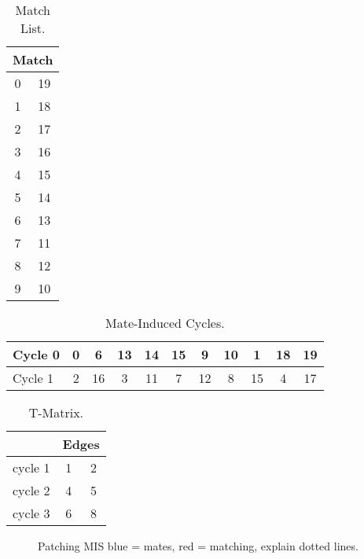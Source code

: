 \documentclass[a4paper, 11pt, twoside, onecolumn, openany]{article}
\begin{document}
\begin{table}[htb]
	\centering
	\begin{tabular}{|c|c|}
		\hline
		\multicolumn{2}{|c|}{Match}\\ \hline
		0 & 19 \\ \hline
		1 & 18 \\ \hline
		2 & 17 \\ \hline
		3 & 16 \\ \hline
		4 & 15 \\ \hline
		5 & 14 \\ \hline
		6 & 13 \\ \hline
		7 & 11 \\ \hline
		8 & 12 \\ \hline
		9 & 10 \\
		\hline
	\end{tabular}
	\caption{Match List.}
\end{table}	


\begin{table}[htb]
	\centering
	\begin{tabular}{|l*{10}{|c}|}
		\hline
		Cycle 0 & 0 & 6 & 13 & 14 & 15 & 9 & 10 & 1 & 18 & 19 \\ \hline
		Cycle 1 & 2 & 16 & 3 & 11 & 7 & 12 & 8 & 15 & 4 & 17 \\
		\hline
	\end{tabular}
	\caption{Mate-Induced Cycles.}	
\end{table}


\begin{table}[htb]
	\centering
	\begin{tabular}{c|c|c|}
		\cline{2-3}
		& \multicolumn{2}{|c|}{Edges} \\ \hline
		\multicolumn{1}{|c|}{cycle 1} & 1 & 2 \\ \hline
		\multicolumn{1}{|c|}{cycle 2} & 4 & 5 \\ \hline
		\multicolumn{1}{|c|}{cycle 3} & 6 & 8 \\
		\hline
	\end{tabular}
	\caption{T-Matrix.}
\end{table}	







\begin{figure}
	\centering
	
	\caption{Patching MIS blue = mates, red = matching, explain dotted lines.}	
\end{figure}
\end{document}

